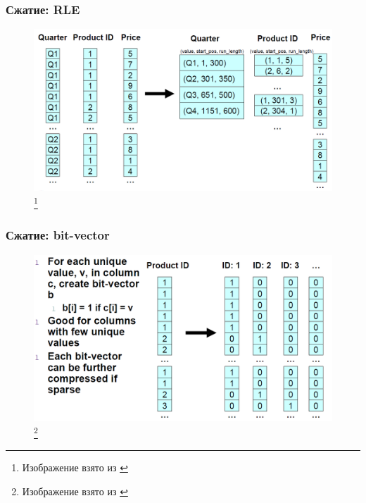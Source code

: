 \documentclass{beamer}
\begin{document}
\begin{frame}
\frametitle{Сжатие: RLE}

\begin{figure}[htb]
\includegraphics[width=\textwidth,height=0.75\textheight,keepaspectratio]{compression1.png} 
\footnote{\tiny{Изображение взято из \cite{Harizopoulos2009}}}
 \end{figure}    

\end{frame}

\begin{frame}
\frametitle{Сжатие: bit-vector}

\begin{figure}[htb]
\includegraphics[width=\textwidth,height=0.75\textheight,keepaspectratio]{compression2.png} 
\footnote{\tiny{Изображение взято из \cite{Harizopoulos2009}}}
 \end{figure}    

\end{frame}
\end{document}
